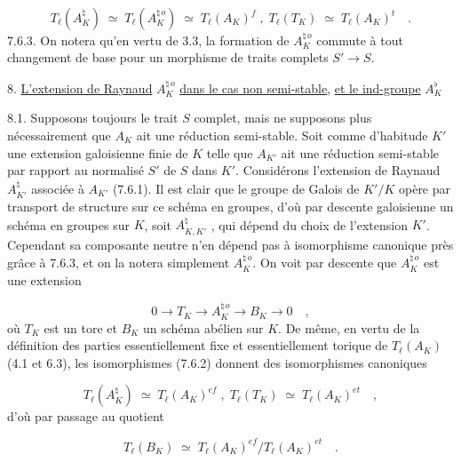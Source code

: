 \begin{equation}\tag{7.6.2}
T_{\ell}(A_K^{\natural}) \;\simeq\; T_{\ell}(A_K^{\natural\,o}) \;\simeq\; T_{\ell}(A_K)^{f} \; , \; T_{\ell}(T_K) \;\simeq\; T_{\ell}(A_K)^{t} \quad .
\end{equation}
7.6.3. On notera qu'en vertu de 3.3, la formation de $A_K^{\natural\,o}$ commute à tout changement de base pour un morphisme de traits complets $S' \longrightarrow S$.




8. \underline{L'extension de Raynaud} $A_K^{\natural\,o}$ \underline{dans le cas non semi-stable}, \underline{et le ind-groupe} $A_K^{\flat}$

8.1. Supposons toujours le trait $S$ complet, mais ne supposons plus nécessairement que $A_K$ ait une réduction semi-stable. Soit comme d'habitude $K'$ une extension galoisienne finie de $K$ telle que $A_{K'}$ ait une réduction semi-stable par rapport au normalisé $S'$ de $S$ dans $K'$. Considérons l'extension de Raynaud $A_{K'}^{\natural}$ associée à $A_{K'}$ (7.6.1). Il est clair que le groupe de Galois de $K'/K$ opère par transport de structure sur ce schéma en groupes, d'où par descente galoisienne un schéma en groupes sur $K$, soit $A_{K,K'}^{\natural}$ , qui dépend du choix de l'extension $K'$. Cependant sa composante neutre n'en dépend pas à isomorphisme canonique près grâce à 7.6.3, et on la notera simplement $A_K^{\natural\,o}$. On voit par descente que $A_K^{\natural\,o}$ est une extension

\begin{equation}\tag{8.1.1}
0 \longrightarrow T_K \longrightarrow A_K^{\natural\,o} \longrightarrow B_K \longrightarrow 0 \quad ,
\end{equation}
où $T_K$ est un tore et $B_K$ un schéma abélien sur $K$. De même, en vertu de la définition des parties essentiellement fixe et essentiellement torique de $T_{\ell}(A_K)$ (4.1 et 6.3), les isomorphismes (7.6.2) donnent des isomorphismes canoniques

\begin{equation}\tag{8.1.2}
T_{\ell}(A_K^{\natural}) \;\simeq\; T_{\ell}(A_K)^{ef} \; , \; T_{\ell}(T_K) \;\simeq\; T_{\ell}(A_K)^{et} \quad ,
\end{equation}
d'où par passage au quotient

\begin{equation}\tag{8.1.3}
T_{\ell}(B_K) \;\simeq\; T_{\ell}(A_K)^{ef}/T_{\ell}(A_K)^{et} \quad .
\end{equation}


